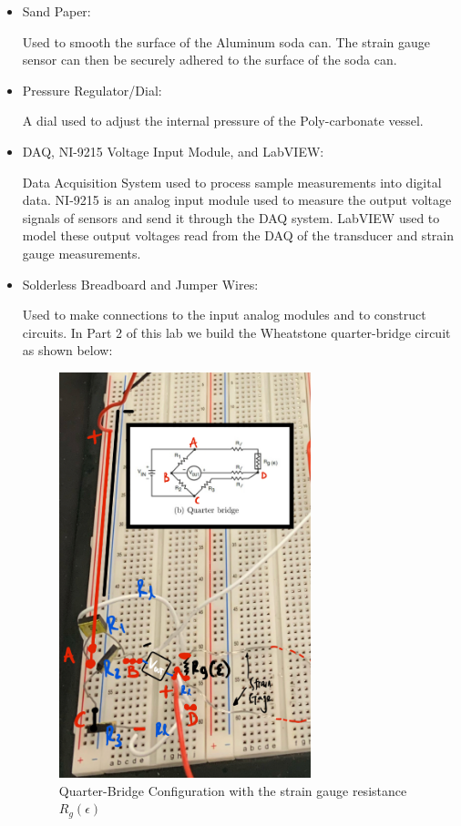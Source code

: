 \documentclass{article}
\begin{document}
\begin{itemize}
\item Sand Paper: 
\vspace{1mm}

Used to smooth the surface of the Aluminum soda can. The strain gauge sensor can then be securely adhered to the surface of the soda can.

\item Pressure Regulator/Dial: 
\vspace{1mm}

A dial used to adjust the internal pressure of the Poly-carbonate vessel.
\vspace{2.5mm}

\item DAQ, NI-9215 Voltage Input Module, and LabVIEW:
\vspace{1mm}

Data Acquisition System used to process sample measurements into digital data. NI-9215 is an analog input module used to measure the output voltage signals of sensors and send it through the DAQ system. LabVIEW used to model these output voltages read from the DAQ of the transducer and strain gauge measurements.
\vspace{2.5mm}

\item Solderless Breadboard and Jumper Wires: 
\vspace{1mm}

Used to make connections to the input analog modules and to construct circuits. In Part 2 of this lab we build the Wheatstone quarter-bridge circuit as shown below:

\begin{figure}[H]
    \centering
    \includegraphics[width=0.69\textwidth]{lab4images/quarterbridge_circuit_lab4.jpg}
    \caption{Quarter-Bridge Configuration with the strain gauge resistance $R_{g}(\epsilon)$}
\end{figure}
\end{itemize}
\end{document}
